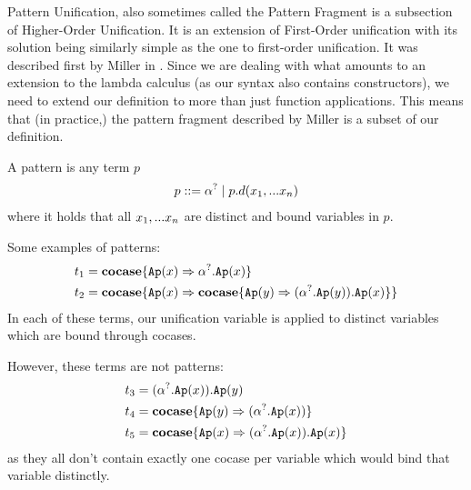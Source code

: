 \documentclass[twoside,12pt,a4paper]{article}
\begin{document}
Pattern Unification, also sometimes called the Pattern Fragment %
is a subsection of Higher-Order Unification. It is an extension of First-Order unification
with its solution being similarly simple as the one to first-order unification.
It was described first by Miller in \cite{10.1093/logcom/1.4.497}.
Since we are dealing with what amounts to an extension to the lambda calculus (as our syntax also contains constructors), we need to extend our definition to more than just function applications. 
This means that (in practice,) the pattern fragment described by Miller is a subset of our definition.

\begin{definition}[Pattern]
    A pattern is any term $p$ 
    \begin{align*}
        p ::= \alpha^? \;|\; p.d(x_1,...x_n)
    \end{align*}
    where it holds that all $x_1,...x_n$ are distinct and bound variables in $p$.
\end{definition}

Some examples of patterns:
\begin{align*}
    \begin{split}
    t_1 &= \textbf{cocase}\{\texttt{Ap}(x)\Rightarrow \alpha^?.\texttt{Ap}(x)\} \\
    t_2 &= \textbf{cocase}\{\texttt{Ap}(x)\Rightarrow \textbf{cocase}\{\texttt{Ap}(y)\Rightarrow (\alpha^?.\texttt{Ap}(y)).\texttt{Ap}(x)\}\}    
    \end{split}
\end{align*} 
In each of these terms, our unification variable is applied to distinct variables which are bound through  cocases.

However, these terms are not patterns:
\begin{align*}
    \begin{split}
        t_3 &= (\alpha^?.\texttt{Ap}(x)).\texttt{Ap}(y)\\
        t_4 &= \textbf{cocase}\{\texttt{Ap}(y)\Rightarrow (\alpha^?.\texttt{Ap}(x))\}\\
        t_5 &= \textbf{cocase}\{\texttt{Ap}(x)\Rightarrow (\alpha^?.\texttt{Ap}(x)).\texttt{Ap}(x)\}
    \end{split}
\end{align*}
as they all don't contain exactly one cocase per variable which would bind that variable distinctly.
\end{document}
